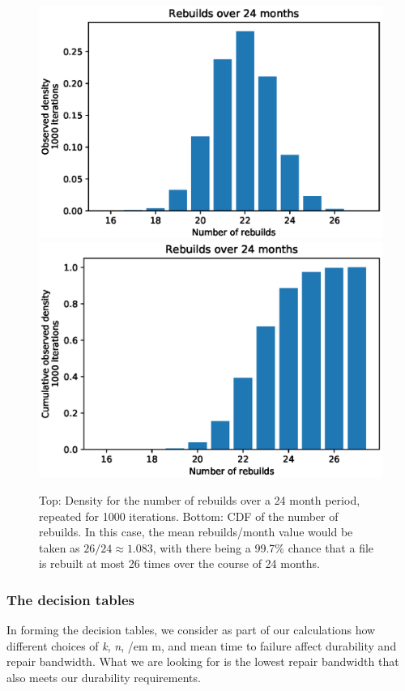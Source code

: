 \linespread{1}
\begin{figure}[h]
    \centering
    \includegraphics[scale=0.5]{RS-appendix-files/example_pmf.eps}
    \includegraphics[scale=0.5]{RS-appendix-files/example_cdf.eps}
    \caption{Top: Density for the number of rebuilds over a 24 month period, repeated for 1000 iterations. Bottom: CDF of the number of rebuilds. In this case, the mean rebuilds/month value would be taken as $26/24\approx1.083$, with there being a 99.7\% chance that a file is rebuilt at most 26 times over the course of 24 months.}
    \label{fig:sim_method}
\end{figure}

\pagebreak
\linespread{1}
\pagebreak
\subsubsection{The decision tables}
In forming the decision tables, we consider as part of our calculations how
different choices of {\em k}, {\em n}, {/em m}, and mean time to failure affect durability and repair bandwidth. What we are looking for is the lowest repair bandwidth that also meets our
durability requirements.



